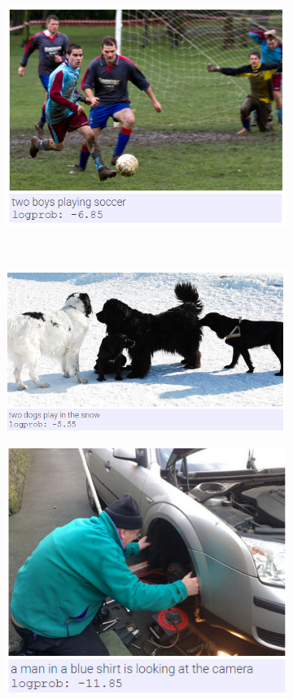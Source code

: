 \begin{figure}
\begin{subfigure}{.5\textwidth}
			\label{fig:intermediateresults3}
		\end{subfigure}%
		\begin{subfigure}{.5\textwidth}
			\centering
			\includegraphics[width=.8\linewidth]{Images/Results/Intermediate/soccer}
			\label{fig:intermediateresults4}
		\end{subfigure}				\\
			\begin{subfigure}{.5\textwidth}
				\centering
				\includegraphics[width=.8\linewidth]{Images/Results/Intermediate/dogs_in_the_snow}
				\label{fig:intermediateresults5}
			\end{subfigure}%
			\begin{subfigure}{.5\textwidth}
				\centering
				\includegraphics[width=.8\linewidth]{Images/Results/Intermediate/looking_at_camera}
				\label{fig:intermediateresults6}
			\end{subfigure}
		

\end{figure}
